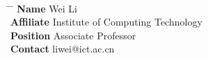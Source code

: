 \documentclass[10pt]{article} %
\begin{document}
\\
\parbox{0.5\textwidth}{ %
\begin{tabbing}
\hspace{1.5cm} \= \hspace{4cm} \= \kill %
{\bf Name} \> Wei Li\\ %
{\bf Affiliate} \> Institute of Computing Technology \\ %
{\bf Position} \> Associate Professor \\ %
{\bf Contact} \> liwei@ict.ac.cn %
\end{tabbing}}
\hfill


\end{document}
